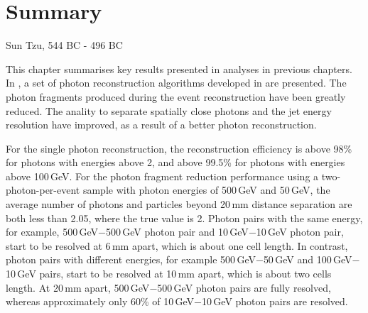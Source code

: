 \chapter{Summary}
\label{chap:summary}



%
{Sun Tzu, 544 BC - 496 BC}




This chapter summarises key results presented in analyses in previous chapters. In , a set of photon reconstruction algorithms developed in \pandora are presented. The photon fragments produced during the event reconstruction have been greatly reduced. The anality to separate spatially close photons and the jet energy resolution have improved, as a result of a better photon reconstruction.

For the single photon reconstruction, the reconstruction efficiency is above 98\% for photons with energies above 2\GeV, and above 99.5\% for photons with energies above 100\,GeV. For the photon fragment reduction performance using a two-photon-per-event sample with photon energies of  500\,GeV and 50\,GeV, the average number of photons and particles beyond 20\,mm distance separation are both less than 2.05, where the true value is 2. Photon pairs with the same energy, for example, 500\,GeV$-$500\,GeV photon pair and 10\,GeV$-$10\,GeV photon pair, start to be resolved at 6\,mm apart, which is about one \ECAL cell length. In contrast, photon pairs with different energies, for example 500\,GeV$-$50\,GeV and  100\,GeV$-$10\,GeV pairs, start to be resolved at 10\,mm apart, which is about two \ECAL cells length. At 20\,mm apart, 500\,GeV$-$500\,GeV photon pairs are fully resolved, whereas approximately only 60\% of 10\,GeV$-$10\,GeV photon pairs are resolved.


